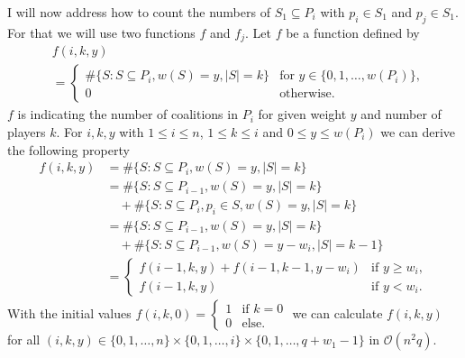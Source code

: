 \documentclass[review]{elsarticle}
\theoremstyle{defn}
\theoremstyle{Pseudo-Code}
\begin{document}
I will now address how to count the numbers of $S_1\subseteq P_i$ with $p_i\in S_1$ and $p_j\in S_1$. For that we will use two functions $f$ and $f_j$.
Let
$f$ 
be a function defined by
\begin{align*}
  &f(i,k,y)
\\  
  &=
  \begin{cases}
  \#\{
    S: S\subseteq P_i, w(S)=y, |S|=k\} & \text{for } y\in \{0,1,\dots,w(P_i)\},
  \\
  0 & \text{otherwise.}
  \end{cases}
\end{align*}
$f$ is indicating the number of coalitions in $P_{i}$ for given weight $y$ and number of players $k$.
For $i,k,y$ with $1\leq i\leq n$, $1\leq k\leq i$ and $0\leq y\leq w(P_i)$ we can derive the following property
   \begin{align*}
      f(i,k,y)
      &=
      \#\{
        S: S\subseteq P_i, w(S)=y, |S|=k
      \}
\\
      &=   
      \#\{
        S: S\subseteq P_{i-1}, w(S)=y, |S|=k
      \} 
\\        
      &\quad +
      \#\{
        S: S\subseteq P_{i}, p_i\in S, w(S)=y, |S|=k
      \}         
\\
      &=   
      \#\{
        S: S\subseteq P_{i-1}, w(S)=y, |S|=k
      \}   
\\        
      &\quad +
      \#\{
        S: S\subseteq P_{i-1}, w(S)=y-w_i,|S|=k-1
      \}   
\\
	  &=
    \begin{cases}
      f(i-1,k,y)+f(i-1,k-1,y-w_i) & \text{if } y\geq w_i, \\
      f(i-1,k,y) & \text{if } y<w_i.
    \end{cases}	                    
    \end{align*}
With the initial values
$    f(i,k,0)
    =
    \begin{cases}
      1 & \text{if } k=0 \\
      0 & \text{else.}
    \end{cases}
$
we can calculate $f(i,k,y)$ for all $(i,k,y)\in \{0,1,\dots,n\}\times\{0,1,\dots,i\}\times\{0,1,\dots,q+w_1-1\}$ in $\mathcal{O}(n^2q)$. 
\end{document}
